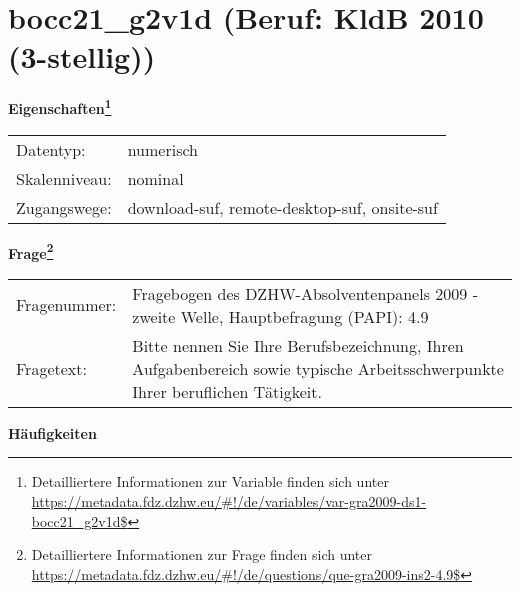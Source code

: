 
    \setcounter{footnote}{0}

    \vspace*{-1.8cm}
	\section{bocc21\_g2v1d (Beruf: KldB 2010 (3-stellig))}
	\label{section:bocc21_g2v1d}



    \vspace*{0.5cm}
    \noindent\textbf{Eigenschaften\footnote{Detailliertere Informationen zur Variable finden sich unter
		\url{https://metadata.fdz.dzhw.eu/\#!/de/variables/var-gra2009-ds1-bocc21_g2v1d$}}}\\
	\begin{tabularx}{\hsize}{@{}lX}
	Datentyp: & numerisch \\
	Skalenniveau: & nominal \\
	Zugangswege: &
	  download-suf, 
	  remote-desktop-suf, 
	  onsite-suf
 \\
    \end{tabularx}



				\vspace*{0.5cm}
                \noindent\textbf{Frage\footnote{Detailliertere Informationen zur Frage finden sich unter
		              \url{https://metadata.fdz.dzhw.eu/\#!/de/questions/que-gra2009-ins2-4.9$}}}\\
				\begin{tabularx}{\hsize}{@{}lX}
					Fragenummer: &
					  Fragebogen des DZHW-Absolventenpanels 2009 - zweite Welle, Hauptbefragung (PAPI):
					  4.9
 \\
					Fragetext: & Bitte nennen Sie Ihre Berufsbezeichnung, Ihren Aufgabenbereich sowie typische Arbeitsschwerpunkte Ihrer beruflichen Tätigkeit. \\
				\end{tabularx}





        		\vspace*{0.5cm}
                \noindent\textbf{Häufigkeiten}

